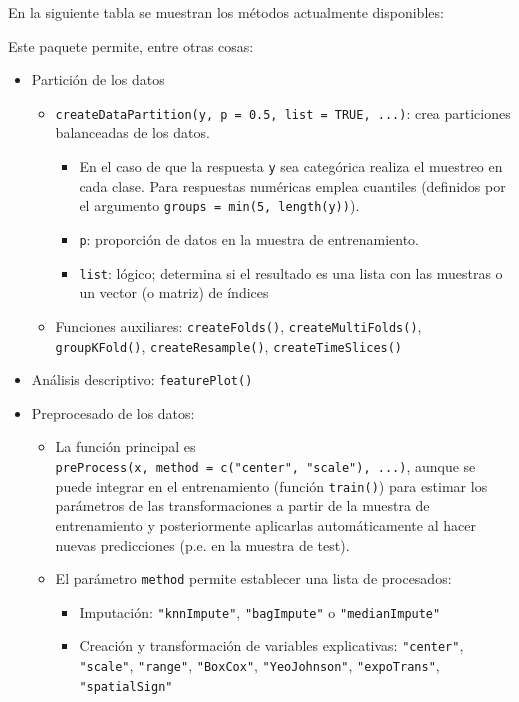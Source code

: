 \documentclass[
]{book}
\theoremstyle{break}
\theoremstyle{definition}
\theoremstyle{definition}
\theoremstyle{definition}
\theoremstyle{remark}
\begin{document}
En la siguiente tabla se muestran los métodos actualmente disponibles:

Este paquete permite, entre otras cosas:

\begin{itemize}
\item
  Partición de los datos

  \begin{itemize}
  \item
    \texttt{createDataPartition(y,\ p\ =\ 0.5,\ list\ =\ TRUE,\ ...)}: crea particiones balanceadas de los datos.

    \begin{itemize}
    \item
      En el caso de que la respuesta \texttt{y} sea categórica realiza el muestreo en cada clase. Para respuestas numéricas emplea cuantiles (definidos por el argumento \texttt{groups\ =\ min(5,\ length(y))}).
    \item
      \texttt{p}: proporción de datos en la muestra de entrenamiento.
    \item
      \texttt{list}: lógico; determina si el resultado es una lista con las muestras o un vector (o matriz) de índices
    \end{itemize}
  \item
    Funciones auxiliares: \texttt{createFolds()}, \texttt{createMultiFolds()}, \texttt{groupKFold()}, \texttt{createResample()}, \texttt{createTimeSlices()}
  \end{itemize}
\item
  Análisis descriptivo: \texttt{featurePlot()}
\item
  Preprocesado de los datos:

  \begin{itemize}
  \item
    La función principal es \texttt{preProcess(x,\ method\ =\ c("center",\ "scale"),\ ...)}, aunque se puede integrar en el entrenamiento (función \texttt{train()}) para estimar los parámetros de las transformaciones a partir de la muestra de entrenamiento y posteriormente aplicarlas automáticamente al hacer nuevas predicciones (p.e. en la muestra de test).
  \item
    El parámetro \texttt{method} permite establecer una lista de procesados:

    \begin{itemize}
    \item
      Imputación: \texttt{"knnImpute"}, \texttt{"bagImpute"} o \texttt{"medianImpute"}
    \item
      Creación y transformación de variables explicativas: \texttt{"center"}, \texttt{"scale"}, \texttt{"range"}, \texttt{"BoxCox"}, \texttt{"YeoJohnson"}, \texttt{"expoTrans"}, \texttt{"spatialSign"}


\end{itemize}
\end{itemize}
\end{itemize}
\end{document}
